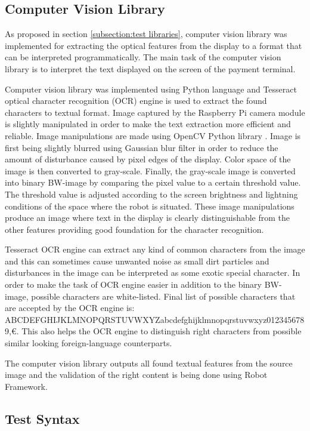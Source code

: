 \subsection{Computer Vision Library}
\label{subsection:Computer vision library}

As proposed in section \ref{subsection:test libraries}, computer vision library was implemented for extracting the optical features from the display to a format that can be interpreted programmatically. The main task of the computer vision library is to interpret the text displayed on the screen of the payment terminal.

Computer vision library was implemented using Python language and Tesseract optical character recognition (OCR) engine is used to extract the found characters to textual format. Image captured by the Raspberry Pi camera module is slightly manipulated in order to make the text extraction more efficient and reliable. Image manipulations are made using OpenCV Python library \citep{opencv}. Image is first being slightly blurred using Gaussian blur filter in order to reduce the amount of disturbance caused by pixel edges of the display. Color space of the image is then converted to gray-scale. Finally, the gray-scale image is converted into binary BW-image by comparing the pixel value to a certain threshold value. The threshold value is adjusted according to the screen brightness and lightning conditions of the space where the robot is situated. These image manipulations produce an image where text in the display is clearly distinguishable from the other features providing good foundation for the character recognition.

Tesseract OCR engine can extract any kind of common characters from the image and this can sometimes cause unwanted noise as small dirt particles and disturbances in the image can be interpreted as some exotic special character. In order to make the task of OCR engine easier in addition to the binary BW-image, possible characters are white-listed. Final list of possible characters that are accepted by the OCR engine is: ABCDEFGHIJKLMNOPQRSTUVWXYZabcdefghijklmnopqrstuvwxyz0123456789,\euro. This also helps the OCR engine to distinguish right characters from possible similar looking foreign-language counterparts.

The computer vision library outputs all found textual features from the source image and the validation of the right content is being done using Robot Framework. 

\subsection{Test Syntax}
\label{subsection:Test syntax}

